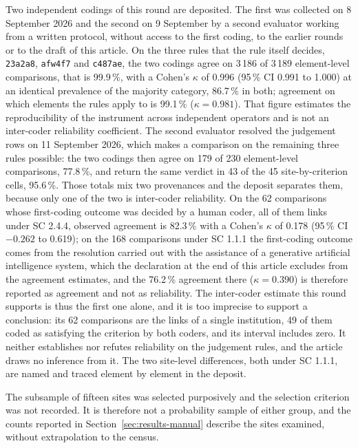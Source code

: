 \documentclass[pdflatex,sn-basic,Numbered,iicol]{sn-jnl}
\theoremstyle{thmstyleone}
\theoremstyle{thmstyletwo}
\theoremstyle{thmstylethree}
\begin{document}
Two independent codings of this round are deposited. The first was collected on 8 September 2026 and the second on 9 September by a second evaluator working from a written protocol, without access to the first coding, to the earlier rounds or to the draft of this article. On the three rules that the rule itself decides, \texttt{23a2a8}, \texttt{afw4f7} and \texttt{c487ae}, the two codings agree on 3\,186 of 3\,189 element-level comparisons, that is 99.9\,\%, with a Cohen's $\kappa$ of 0.996 (95\,\% CI 0.991 to 1.000) at an identical prevalence of the majority category, 86.7\,\% in both; agreement on which elements the rules apply to is 99.1\,\% ($\kappa=0.981$). That figure estimates the reproducibility of the instrument across independent operators and is not an inter-coder reliability coefficient. The second evaluator resolved the judgement rows on 11 September 2026, which makes a comparison on the remaining three rules possible: the two codings then agree on 179 of 230 element-level comparisons, 77.8\,\%, and return the same verdict in 43 of the 45 site-by-criterion cells, 95.6\,\%. Those totals mix two provenances and the deposit separates them, because only one of the two is inter-coder reliability. On the 62 comparisons whose first-coding outcome was decided by a human coder, all of them links under SC 2.4.4, observed agreement is 82.3\,\% with a Cohen's $\kappa$ of 0.178 (95\,\% CI $-0.262$ to 0.619); on the 168 comparisons under SC 1.1.1 the first-coding outcome comes from the resolution carried out with the assistance of a generative artificial intelligence system, which the declaration at the end of this article excludes from the agreement estimates, and the 76.2\,\% agreement there ($\kappa=0.390$) is therefore reported as agreement and not as reliability. The inter-coder estimate this round supports is thus the first one alone, and it is too imprecise to support a conclusion: its 62 comparisons are the links of a single institution, 49 of them coded as satisfying the criterion by both coders, and its interval includes zero. It neither establishes nor refutes reliability on the judgement rules, and the article draws no inference from it. The two site-level differences, both under SC 1.1.1, are named and traced element by element in the deposit.

The subsample of fifteen sites was selected purposively and the selection criterion was not recorded. It is therefore not a probability sample of either group, and the counts reported in Section~\ref{sec:results-manual} describe the sites examined, without extrapolation to the census.
\end{document}
